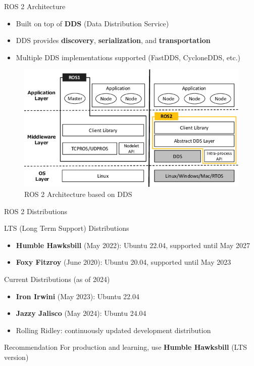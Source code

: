 \begin{frame}{ROS 2 Architecture}

    \begin{itemize}
        \item Built on top of \textbf{DDS} (Data Distribution Service)
        \item DDS provides \textbf{discovery}, \textbf{serialization}, and \textbf{transportation}
        \item Multiple DDS implementations supported (FastDDS, CycloneDDS, etc.)
    \end{itemize}
    \begin{figure}
        \centering
        \includegraphics[width=0.99\textheight]{img/ros2/ROS1-ROS2-architecture-1.png}
        \caption{ROS 2 Architecture based on DDS}
    \end{figure}
\end{frame}

\begin{frame}[allowframebreaks]{ROS 2 Distributions}
    \begin{block}{LTS (Long Term Support) Distributions}
        \begin{itemize}
            \item \textbf{Humble Hawksbill} (May 2022): Ubuntu 22.04, supported until May 2027
            \item \textbf{Foxy Fitzroy} (June 2020): Ubuntu 20.04, supported until May 2023
        \end{itemize}
    \end{block}

    \begin{block}{Current Distributions (as of 2024)}
        \begin{itemize}
            \item \textbf{Iron Irwini} (May 2023): Ubuntu 22.04
            \item \textbf{Jazzy Jalisco} (May 2024): Ubuntu 24.04
            \item Rolling Ridley: continuously updated development distribution
        \end{itemize}
    \end{block}

    \begin{alertblock}{Recommendation}
        For production and learning, use \textbf{Humble Hawksbill} (LTS version)
    \end{alertblock}
\end{frame}


